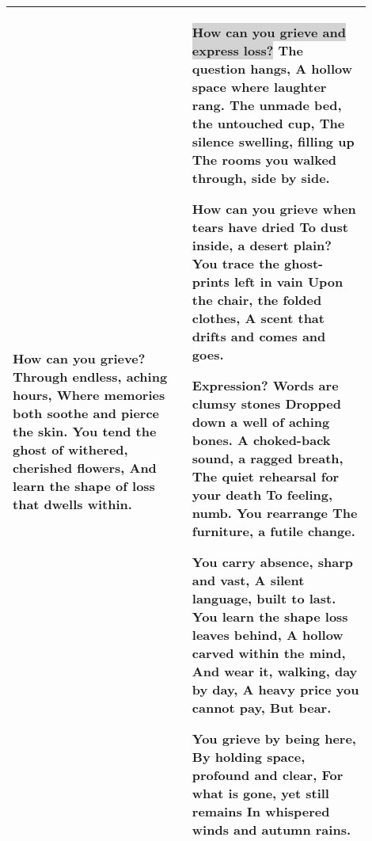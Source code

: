 \begin{table}[!htbp]
{\begin{tabular}{p{0.45\linewidth}p{0.45\linewidth}}
    How can you grieve? Through endless, aching hours,
    Where memories both soothe and pierce the skin.
    You tend the ghost of withered, cherished flowers,
    And learn the shape of loss that dwells within. \par\medskip
    & 
     \colorbox{LightGray}{How can you grieve and express loss?} The question hangs,
    A hollow space where laughter rang.
    The unmade bed, the untouched cup,
    The silence swelling, filling up
    The rooms you walked through, side by side.
    \par\medskip
    How can you grieve when tears have dried
    To dust inside, a desert plain?
    You trace the ghost-prints left in vain
    Upon the chair, the folded clothes,
    A scent that drifts and comes and goes.
    \par\medskip
    Expression? Words are clumsy stones
    Dropped down a well of aching bones.
    A choked-back sound, a ragged breath,
    The quiet rehearsal for your death
    To feeling, numb. You rearrange
    The furniture, a futile change.
    \par\medskip
    You carry absence, sharp and vast,
    A silent language, built to last.
    You learn the shape loss leaves behind,
    A hollow carved within the mind,
    And wear it, walking, day by day,
    A heavy price you cannot pay,
    But bear.
    \par\medskip
    You grieve by being here,
    By holding space, profound and clear,
    For what is gone, yet still remains
    In whispered winds and autumn rains.\\
    \bottomrule
    \end{tabular}
    }
\end{table}



